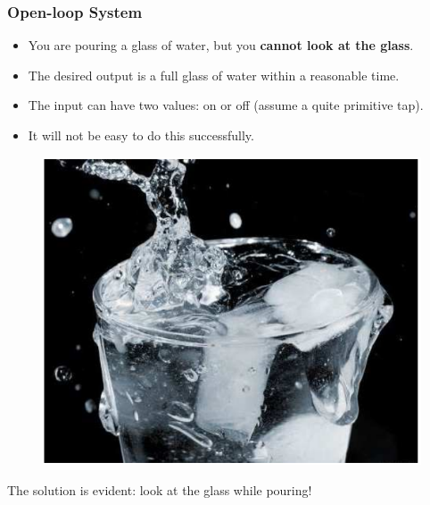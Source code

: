 \begin{frame}
	\frametitle{Open-loop System}
	\vspace*{-1em}
	\begin{example}
		\begin{minipage}{0.5\linewidth}
			\begin{itemize}
				\item You are pouring a glass of water, but you \textbf{cannot look at the glass}.
				\item The desired output is a full glass of water within a reasonable time.
				\item The input can have two values: on or off (assume a quite primitive tap).
				\item It will not be easy to do this successfully.
			\end{itemize}
		\end{minipage}
		\hfill
		\begin{minipage}{0.48\linewidth}
			\begin{figure}
				\includegraphics[width=1\linewidth]{glass}
			\end{figure}
		\end{minipage}
		\parbox{\linewidth}{\vspace{1em} \quad The solution is evident: look at the glass while pouring!}
	\end{example}
\end{frame}

